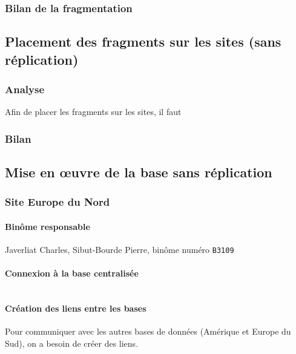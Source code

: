 \documentclass[10pt,a4paper]{article}
\theoremstyle{plain}
\begin{document}
\subsubsection{Bilan de la fragmentation}

\subsection{Placement des fragments sur les sites (sans réplication)}
\subsubsection{Analyse}
Afin de placer les fragments sur les sites, il faut 
\subsubsection{Bilan}

\newpage
\subsection{Mise en \oe uvre de la base sans réplication}
\subsubsection{Site Europe du Nord}

\paragraph{Binôme responsable}

Javerliat Charles, Sibut-Bourde Pierre, binôme numéro \verb|B3109|

\paragraph{Connexion à la base centralisée}

\inputminted{sql}{EUN_connexion_db_ryori.sql}

\paragraph{Création des liens entre les bases}

Pour communiquer avec les autres bases de données (Amérique et Europe du Sud), on a besoin de créer des liens.
\end{document}
